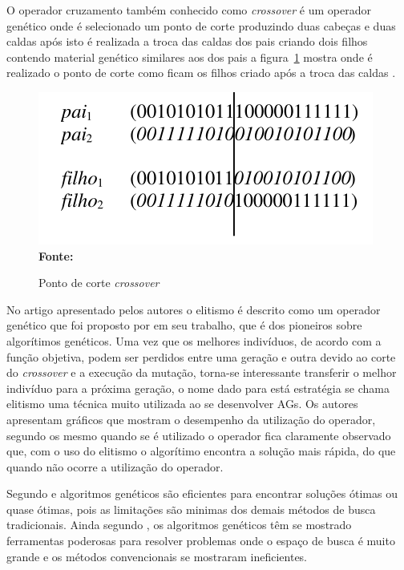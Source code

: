 O operador cruzamento também conhecido como \textit{crossover} é um operador genético onde é selecionado um ponto de corte produzindo duas cabeças e duas caldas após isto é realizada a troca das caldas dos pais criando dois filhos contendo material genético similares aos dos pais a figura~\ref{fig:pontoCorteAG} mostra onde é realizado o ponto de corte como ficam os filhos criado após a troca das caldas \cite{de1999introduccao}.

\begin{figure}[!htb]
\caption[Ponto de corte \textit{crossover}]{Ponto de corte \textit{crossover}}
\label{fig:pontoCorteAG}
\centering
\includegraphics[scale=0.6]{imagens/crossoverAG.png}
\\ \textbf{\footnotesize Fonte: \cite{de1999introduccao}}
\end{figure}

No artigo apresentado pelos autores \cite{de1999introduccao} o elitismo é descrito como um operador genético que foi proposto por \cite{DeJong} em seu trabalho, que é dos pioneiros sobre algorítimos genéticos. Uma vez que os melhores indivíduos, de acordo com a função objetiva, podem ser perdidos entre uma geração e outra devido ao corte do \textit{crossover} e a execução da mutação, torna-se interessante transferir o melhor indivíduo para a próxima geração, o nome dado para está estratégia se chama elitismo uma técnica muito utilizada ao se desenvolver AGs. Os autores apresentam gráficos que mostram o desempenho da utilização do operador, segundo os mesmo quando se é utilizado o operador fica claramente observado que, com o uso do elitismo o algorítimo encontra a solução mais rápida, do que quando não ocorre a utilização do operador.

Segundo \cite{hamawaki2011geraccao} e \cite{oliveira2005algoritmo} algoritmos genéticos são eficientes para encontrar soluções ótimas ou quase ótimas, pois as limitações são minimas dos demais métodos de busca tradicionais. Ainda segundo \cite{oliveira2005algoritmo}, os algoritmos genéticos têm se mostrado ferramentas poderosas para resolver problemas onde o espaço de busca é muito grande e os métodos convencionais se mostraram ineficientes.\par


